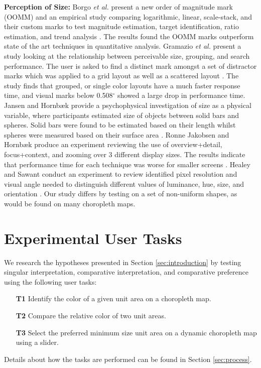 \textbf{Perception of Size:}
Borgo \textit{et al.} present a new order of magnitude mark (OOMM) and an empirical study comparing logarithmic, linear, scale-stack, and their custom marks to test magnitude estimation, target identification, ratio estimation, and trend analysis \cite{borgo2014order}. The results found the  OOMM marks outperform state of the art techniques in quantitative analysis. Gramazio \textit{et al.} present a study looking at the relationship between perceivable size, grouping, and search performance. The user is asked to find a distinct mark amongst a set of distractor marks which was applied to a grid layout as well as a scattered layout \cite{gramazio2014relation}. The study finds that grouped, or single color layouts have a much faster response time, and visual marks below 0.508$^\circ$ showed a large drop in performance time. Jansen and Hornb{\ae}k provide a psychophysical investigation of size as a physical variable, where participants estimated size of objects between solid bars and spheres. Solid bars were found to be estimated based on their length whilst spheres were measured based on their surface area \cite{jansen2016psychophysical}.  Ronne Jakobsen and Hornb{\ae}k produce an experiment reviewing the use of overview+detail, focus+context, and zooming over 3 different display sizes. The results indicate that performance time for each technique was worse for smaller screens \cite{ronne2011sizing}. Healey and Sawant conduct an experiment to review identified pixel resolution and visual angle needed to distinguish different values of luminance, hue, size, and orientation \cite{healey2012on}. Our study differs by testing on a set of non-uniform shapes, as would be found on many choropleth maps.


\section{Experimental User Tasks} \label{sec:tasks}
We research the hypotheses presented in Section \ref{sec:introduction} by testing singular interpretation, comparative interpretation, and comparative preference using the following user tasks:
\begin{itemize}[labelindent=1em, labelsep=0.2cm, leftmargin=*]
\item[\textbf{T1}] Identify the color of a given unit area on a choropleth map.
\item[\textbf{T2}] Compare the relative color of two unit areas.
\item[\textbf{T3}] Select the preferred minimum size unit area on a dynamic choropleth map using a slider.
\end{itemize}
Details about how the tasks are performed can be found in Section \ref{sec:process}.

